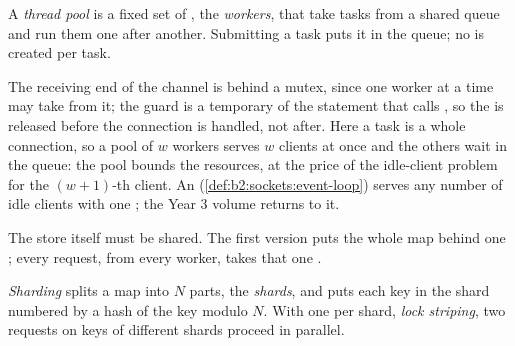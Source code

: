 \begin{definition}\label{def:b2:project-key-value-server:pool}
A \emph{thread pool} is a fixed set of , the \emph{workers}, that take tasks from a shared
queue and run them one after another. Submitting a task puts it in the queue; no  is created per task.
\end{definition}

\label{lst:b2:project-key-value-server:pool}

The receiving end of the channel is behind a mutex, since one worker at a time may take from it; the guard is a
temporary of the statement that calls , so the  is released before the connection is handled, not
after. Here a task is a whole connection, so a pool of $w$ workers serves $w$ clients at once and the others wait in the
queue: the pool bounds the resources, at the price of the idle-client problem for the $(w + 1)$-th client. An 
(\cref{def:b2:sockets:event-loop}) serves any number of idle clients with one ; the Year 3 volume returns to it.

The store itself must be shared. The first version puts the whole map behind one ; every request, from
every worker, takes that one .

\label{lst:b2:project-key-value-server:store}

\begin{definition}\label{def:b2:project-key-value-server:shard}
\emph{Sharding} splits a map into $N$ parts, the \emph{shards}, and puts each key in the shard numbered
by a hash of the key modulo $N$. With one  per shard, \emph{lock striping}, two requests on keys
of different shards proceed in parallel.
\end{definition}

